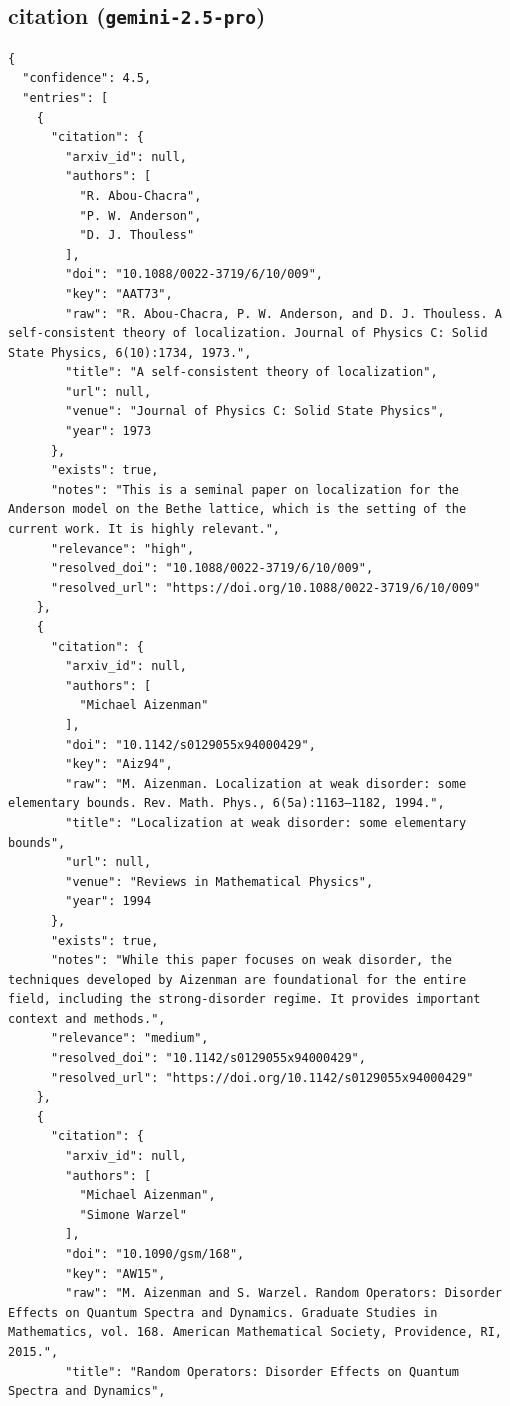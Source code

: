 \documentclass[11pt]{article}
\begin{document}
\subsection*{citation (\texttt{gemini-2.5-pro})}
\begin{verbatim}
{
  "confidence": 4.5,
  "entries": [
    {
      "citation": {
        "arxiv_id": null,
        "authors": [
          "R. Abou-Chacra",
          "P. W. Anderson",
          "D. J. Thouless"
        ],
        "doi": "10.1088/0022-3719/6/10/009",
        "key": "AAT73",
        "raw": "R. Abou-Chacra, P. W. Anderson, and D. J. Thouless. A self-consistent theory of localization. Journal of Physics C: Solid State Physics, 6(10):1734, 1973.",
        "title": "A self-consistent theory of localization",
        "url": null,
        "venue": "Journal of Physics C: Solid State Physics",
        "year": 1973
      },
      "exists": true,
      "notes": "This is a seminal paper on localization for the Anderson model on the Bethe lattice, which is the setting of the current work. It is highly relevant.",
      "relevance": "high",
      "resolved_doi": "10.1088/0022-3719/6/10/009",
      "resolved_url": "https://doi.org/10.1088/0022-3719/6/10/009"
    },
    {
      "citation": {
        "arxiv_id": null,
        "authors": [
          "Michael Aizenman"
        ],
        "doi": "10.1142/s0129055x94000429",
        "key": "Aiz94",
        "raw": "M. Aizenman. Localization at weak disorder: some elementary bounds. Rev. Math. Phys., 6(5a):1163–1182, 1994.",
        "title": "Localization at weak disorder: some elementary bounds",
        "url": null,
        "venue": "Reviews in Mathematical Physics",
        "year": 1994
      },
      "exists": true,
      "notes": "While this paper focuses on weak disorder, the techniques developed by Aizenman are foundational for the entire field, including the strong-disorder regime. It provides important context and methods.",
      "relevance": "medium",
      "resolved_doi": "10.1142/s0129055x94000429",
      "resolved_url": "https://doi.org/10.1142/s0129055x94000429"
    },
    {
      "citation": {
        "arxiv_id": null,
        "authors": [
          "Michael Aizenman",
          "Simone Warzel"
        ],
        "doi": "10.1090/gsm/168",
        "key": "AW15",
        "raw": "M. Aizenman and S. Warzel. Random Operators: Disorder Effects on Quantum Spectra and Dynamics. Graduate Studies in Mathematics, vol. 168. American Mathematical Society, Providence, RI, 2015.",
        "title": "Random Operators: Disorder Effects on Quantum Spectra and Dynamics",

\end{verbatim}
\end{document}
